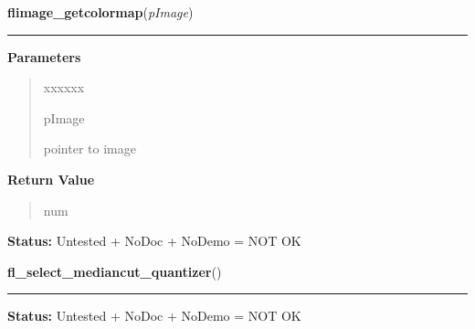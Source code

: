 \hspace{.8\funcindent}\begin{boxedminipage}{\funcwidth}

    \raggedright \textbf{flimage\_getcolormap}(\textit{pImage})

    \vspace{-1.5ex}

    \rule{\textwidth}{0.5\fboxrule}
\setlength{\parskip}{2ex}
\setlength{\parskip}{1ex}
      \textbf{Parameters}
      \vspace{-1ex}

      \begin{quote}
        \begin{Ventry}{xxxxxx}

          \item[pImage]

          pointer to image

        \end{Ventry}

      \end{quote}

      \textbf{Return Value}
    \vspace{-1ex}

      \begin{quote}
      num

      \end{quote}

\textbf{Status:} Untested + NoDoc + NoDemo = NOT OK



    \end{boxedminipage}

    \label{xformslib:library:fl_select_mediancut_quantizer}

    \vspace{0.5ex}

\hspace{.8\funcindent}\begin{boxedminipage}{\funcwidth}

    \raggedright \textbf{fl\_select\_mediancut\_quantizer}()

    \vspace{-1.5ex}

    \rule{\textwidth}{0.5\fboxrule}
\setlength{\parskip}{2ex}
\setlength{\parskip}{1ex}
\textbf{Status:} Untested + NoDoc + NoDemo = NOT OK



    \end{boxedminipage}

